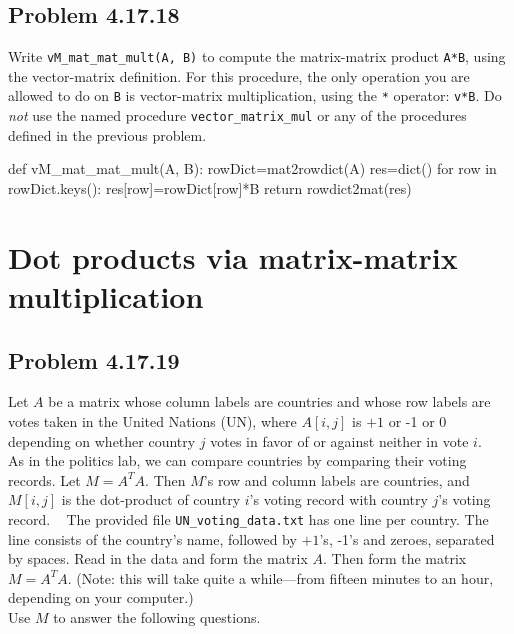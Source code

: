 \documentclass[
  letterpaper,
  DIV=11,
  numbers=noendperiod]{scrartcl}
\newenvironment{Shaded}{\begin{snugshade}}{\end{snugshade}}
\newcommand{\BuiltInTok}[1]{\textcolor[rgb]{0.00,0.23,0.31}{#1}}
\newcommand{\ControlFlowTok}[1]{\textcolor[rgb]{0.00,0.23,0.31}{#1}}
\newcommand{\KeywordTok}[1]{\textcolor[rgb]{0.00,0.23,0.31}{#1}}
\newcommand{\NormalTok}[1]{\textcolor[rgb]{0.00,0.23,0.31}{#1}}
\newcommand{\OperatorTok}[1]{\textcolor[rgb]{0.37,0.37,0.37}{#1}}
\begin{document}
\hypertarget{problem-4.17.18}{%
\subsection{Problem 4.17.18}\label{problem-4.17.18}}

Write \texttt{vM\_mat\_mat\_mult(A,\ B)} to compute the matrix-matrix
product \texttt{A*B}, using the vector-matrix definition. For this
procedure, the only operation you are allowed to do on \texttt{B} is
vector-matrix multiplication, using the \texttt{*} operator:
\texttt{v*B}. Do \emph{not} use the named procedure
\texttt{vector\_matrix\_mul} or any of the procedures defined in the
previous problem.

\begin{Shaded}
\begin{Highlighting}[numbers=left,,]
\KeywordTok{def}\NormalTok{ vM\_mat\_mat\_mult(A, B):}
\NormalTok{  rowDict}\OperatorTok{=}\NormalTok{mat2rowdict(A)}
\NormalTok{  res}\OperatorTok{=}\BuiltInTok{dict}\NormalTok{()}
  \ControlFlowTok{for}\NormalTok{ row }\KeywordTok{in}\NormalTok{ rowDict.keys():}
\NormalTok{    res[row]}\OperatorTok{=}\NormalTok{rowDict[row]}\OperatorTok{*}\NormalTok{B}
  \ControlFlowTok{return}\NormalTok{ rowdict2mat(res)}
\end{Highlighting}
\end{Shaded}

\newpage{}

\hypertarget{dot-products-via-matrix-matrix-multiplication}{%
\section{Dot products via matrix-matrix
multiplication}\label{dot-products-via-matrix-matrix-multiplication}}

\hypertarget{problem-4.17.19}{%
\subsection{Problem 4.17.19}\label{problem-4.17.19}}

Let \(A\) be a matrix whose column labels are countries and whose row
labels are votes taken in the United Nations (UN), where \(A[i, j]\) is
\(+1\) or -1 or 0 depending on whether country \(j\) votes in favor of
or against neither in vote \(i\).\\
As in the politics lab, we can compare countries by comparing their
voting records. Let \(M = A^TA\). Then \(M\)'s row and column labels are
countries, and \(M[i, j]\) is the dot-product of country \(i\)'s voting
record with country \(j\)'s voting record. ~ The provided file
\texttt{UN\_voting\_data.txt} has one line per country. The line
consists of the country's name, followed by \(+1\)'s, -1's and zeroes,
separated by spaces. Read in the data and form the matrix \(A\). Then
form the matrix \(M = A^TA\). (Note: this will take quite a while---from
fifteen minutes to an hour, depending on your computer.)\\
Use \(M\) to answer the following questions.
\end{document}
